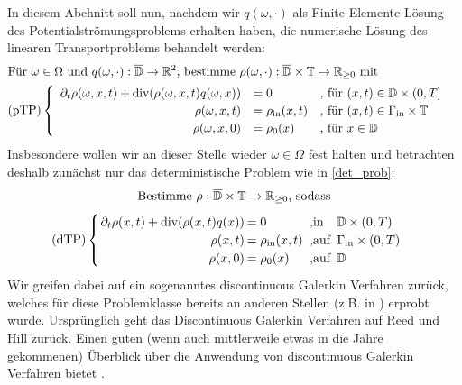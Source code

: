 
In diesem Abchnitt soll nun, nachdem wir $q(\omega,\cdot)$ als Finite-Elemente-Lösung des Potentialströmungsproblems erhalten haben, die numerische Lösung des linearen Transportproblems behandelt werden:
\begin{align*}
	&\text{Für } \omega \in \Omega \text{ und }q(\omega,\cdot): \overline{\mathbb{D}} \to \mathbb{R}^2 \text{, bestimme }\rho(\omega,\cdot): \overline{\mathbb{D}} \times \mathbb{T} \to \mathbb{R}_{\geq 0} \text{ mit} \\
	&\text{(pTP)} 
	\begin{cases}
	\begin{array}{rlll}
	\partial_t \rho (\omega, x, t) + \operatorname{div}(\rho(\omega,x,t)q(\omega,x)) &= 0 &\text{, für } (x,t) \in \mathbb{D} \times (0,T] \\
	\rho(\omega,x,t) &= \rho_{\text{in}}(x,t) &\text{, für } (x,t) \in \Gamma_{\text{in}} \times \mathbb{T} \\
	\rho(\omega,x,0)  &= \rho_0(x) &\text{, für } x \in  \mathbb{D}
	\end{array}
	\end{cases} \\
\end{align*}
Insbesondere wollen wir an dieser Stelle wieder $\omega \in \Omega$ fest halten und betrachten deshalb zunächst nur das deterministische Problem wie in \ref{det_prob}:
\[ 
\text{Bestimme } \rho: \overline{\mathbb{D}} \times \mathbb{T} \to \R_{\geq 0} \text{, sodass} \newline \]
\[\setlength\arraycolsep{1pt}
\text{(dTP)}\begin{cases} 
\begin{array}{rlll}
\partial_t \rho(x,t) + \dive(\rho(x,t) q(x)) &= 0 &\text{ ,in } &\mathbb{D} \times (0,T)\\
\rho(x,t) &= \rho_{\text{in}}(x,t) &\text{ ,auf } &\Gamma_{\text{in}} \times (0,T)\\
\rho(x,0) &= \rho_0(x) &\text{ ,auf } &\mathbb{D} \\
\end{array}
\end{cases} \\
\]
 Wir greifen dabei auf ein sogenanntes discontinuous Galerkin Verfahren zurück, welches für diese Problemklasse bereits an anderen Stellen (z.B. in \cite{cockburn1998runge}) erprobt wurde. Ursprünglich geht das Discontinuous Galerkin Verfahren auf Reed und Hill \cite{reed1973triangular} zurück. Einen guten (wenn auch mittlerweile etwas in die Jahre gekommenen) Überblick über die Anwendung von discontinuous Galerkin Verfahren bietet \cite{cockburn2000development}.
